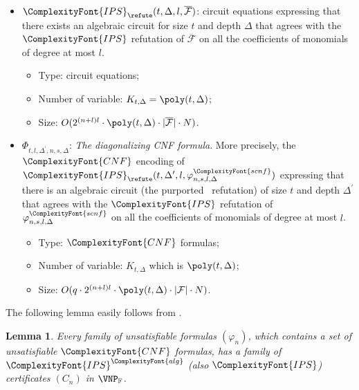 \documentclass[11pt,letter]{article}
\newtheorem{lemma}[theorem]{Lemma}
\theoremstyle{remark} %
\newcommand{\alg}{\ComplexityFont{alg}}
\newcommand{\IPS}{%
    {
        \ComplexityFont{IPS} 
    }
}
\newcommand{\CNF}{ %
    {
        \ComplexityFont{CNF}
    }
}
\newcommand{\scnf}{
    {
        \ComplexityFont{scnf}
    }
}
\begin{document}
{\begin{itemize}
\begin{itemize}
                \item Number of variable: $O(2^{(n+l)l} \cdot \poly(s, \Delta) \cdot N)$.
            \end{itemize}
        \item $\IPS_{\refute}(t,\Delta,l,\overline{\mathcal{F}})$: circuit equations expressing that there exists an algebraic circuit for size $t$ and depth $\Delta$ that agrees with the $\IPS$ refutation of $\overline{\mathcal{F}}$ on all the coefficients of monomials of degree at most $l$. 
            \begin{itemize}
                \item Type: circuit equations;
                \item Number of variable: $K_{t, \Delta}=\poly(t, \Delta)$; 
                \item Size: $O(2^{(n+l)l} \cdot \poly(t, \Delta) \cdot |\overline {\mathcal{F}}| \cdot N)$.
            \end{itemize}
        \item  $\Phi_{t,l,\Delta^\prime,n,s,\Delta}$: \emph{The diagonalizing CNF formula}. More precisely, the $\CNF$ encoding of $\IPS_\refute(t,\Delta^\prime,l,\varphi_{n,s,l,\Delta}^\scnf)$ expressing that there is an algebraic circuit (the purported \IPS\ refutation) of size $t$ and depth $\Delta^\prime$ that agrees with the $\IPS$ refutation of $\varphi_{n,s,l,\Delta}^\scnf$ on all the coefficients of monomials of degree at most $l$.
            \begin{itemize}
                \item Type: $\CNF$ formulas;
                \item Number of variable: $K_{t, \Delta}$ which is $\poly(t, \Delta)$;
                \item Size: $O(q \cdot 2^{(n+l)l} \cdot \poly(t, \Delta) \cdot |\mathcal{F}| \cdot N)$.
            \end{itemize}
    \end{itemize}
   

    The following lemma easily follows from .
    \begin{lemma}
        \label{lemma: unsat eCNF formulastar has VNP refutation}
        Every family of unsatisfiable formulas $(\varphi_n)$, which contains a set of unsatisfiable $\CNF$ formulas, has a family of $\IPS^\alg$ (also $\IPS$) certificates $(C_n)$ in $\VNP_\mathbb{F}$.
    \end{lemma}

}
\end{document}
